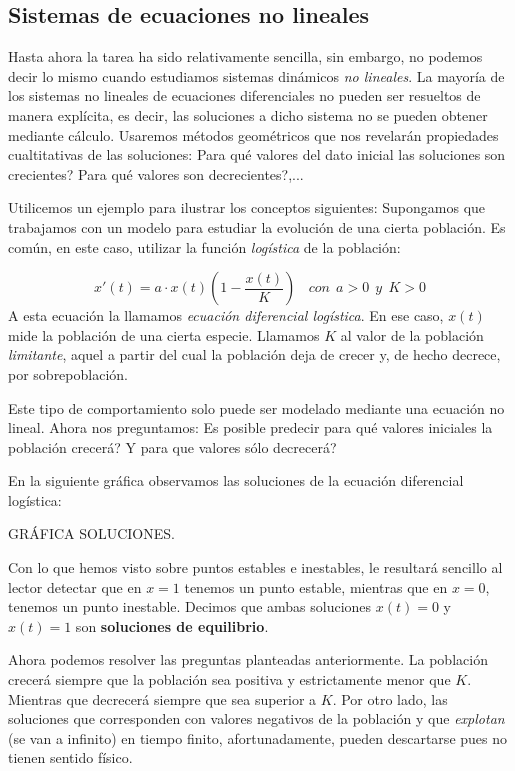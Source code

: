 \subsection{Sistemas de ecuaciones no lineales}
Hasta ahora la tarea ha sido relativamente sencilla, sin embargo, no podemos decir lo mismo cuando estudiamos sistemas dinámicos \emph{no lineales}. La mayoría de los sistemas no lineales de ecuaciones diferenciales no pueden ser resueltos de manera explícita, es decir, las soluciones a dicho sistema no se pueden obtener mediante cálculo. Usaremos métodos geométricos que nos revelarán propiedades cualtitativas de las soluciones: Para qué valores del dato inicial las soluciones son crecientes? Para qué valores son decrecientes?,...

Utilicemos un ejemplo para ilustrar los conceptos siguientes: Supongamos que trabajamos con un modelo para estudiar la evolución de una cierta población. Es común, en este caso, utilizar la función \emph{logística} de la población:

\begin{equation}
x'(t) = a\cdot x(t)(1-\frac{x(t)}{K})~~~~con~~a>0~~y~~K>0
\end{equation}
A esta ecuación la llamamos \emph{ecuación diferencial logística}. En ese caso, $x(t)$ mide la población de una cierta especie. Llamamos $K$ al valor de la población \emph{limitante}, aquel a partir del cual la población deja de crecer y, de hecho decrece, por sobrepoblación.

Este tipo de comportamiento solo puede ser modelado mediante una ecuación no lineal. Ahora nos preguntamos: Es posible predecir para qué valores iniciales la población crecerá? Y para que valores sólo decrecerá?

En la siguiente gráfica observamos las soluciones de la ecuación diferencial logística:\newline

GRÁFICA SOLUCIONES.\newline

Con lo que hemos visto sobre puntos estables e inestables, le resultará sencillo al lector detectar que en $x=1$ tenemos un punto estable, mientras que en $x=0$, tenemos un punto inestable. Decimos que ambas soluciones $x(t) = 0$ y $x(t) = 1$ son \textbf{soluciones de equilibrio}.

Ahora podemos resolver las preguntas planteadas anteriormente. La población crecerá siempre que la población sea positiva y estrictamente menor que $K$. Mientras que decrecerá siempre que sea superior a $K$. Por otro lado, las soluciones que corresponden con valores negativos de la población y que \emph{explotan} (se van a infinito) en tiempo finito, afortunadamente, pueden descartarse pues no tienen sentido físico.\newline

